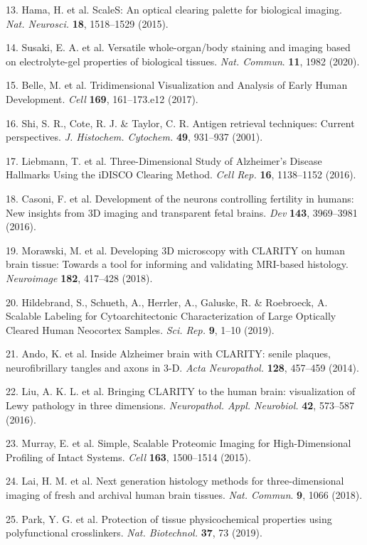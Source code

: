 \documentclass{article}
\begin{document}
\begin{hangpars}
13. Hama, H. et al. ScaleS: An optical clearing palette for biological imaging. \emph{Nat. Neurosci.} \textbf{18}, 1518–1529 (2015).

14. Susaki, E. A. et al. Versatile whole-organ/body staining and imaging based on electrolyte-gel properties of biological tissues. \emph{Nat. Commun}. \textbf{11}, 1982 (2020).

15. Belle, M. et al. Tridimensional Visualization and Analysis of Early Human Development. \emph{Cell} \textbf{169}, 161–173.e12 (2017).

16. Shi, S. R., Cote, R. J. \& Taylor, C. R. Antigen retrieval techniques: Current perspectives. \emph{J. Histochem. Cytochem.} \textbf{49}, 931–937 (2001).

17. Liebmann, T. et al. Three-Dimensional Study of Alzheimer’s Disease Hallmarks Using the iDISCO Clearing Method. \emph{Cell Rep.} \textbf{16}, 1138–1152 (2016).

18. Casoni, F. et al. Development of the neurons controlling fertility in humans: New insights from 3D imaging and transparent fetal brains. \emph{Dev} \textbf{143}, 3969–3981 (2016).

19. Morawski, M. et al. Developing 3D microscopy with CLARITY on human brain tissue: Towards a tool for informing and validating MRI-based histology. \emph{Neuroimage} \textbf{182}, 417–428 (2018).

20. Hildebrand, S., Schueth, A., Herrler, A., Galuske, R. \& Roebroeck, A. Scalable Labeling for Cytoarchitectonic Characterization of Large Optically Cleared Human Neocortex Samples. \emph{Sci. Rep.} \textbf{9}, 1–10 (2019).

21. Ando, K. et al. Inside Alzheimer brain with CLARITY: senile plaques, neurofibrillary tangles and axons in 3-D. \emph{Acta Neuropathol.} \textbf{128}, 457–459 (2014).

22. Liu, A. K. L. et al. Bringing CLARITY to the human brain: visualization of Lewy pathology in three dimensions. \emph{Neuropathol. Appl. Neurobiol.} \textbf{42}, 573–587 (2016).

23. Murray, E. et al. Simple, Scalable Proteomic Imaging for High-Dimensional Profiling of Intact Systems. \emph{Cell} \textbf{163}, 1500–1514 (2015).

24. Lai, H. M. et al. Next generation histology methods for three-dimensional imaging of fresh and archival human brain tissues. \emph{Nat. Commun}. \textbf{9}, 1066 (2018).

25. Park, Y. G. et al. Protection of tissue physicochemical properties using polyfunctional crosslinkers. \emph{Nat. Biotechnol.} \textbf{37}, 73 (2019).


\end{hangpars}
\end{document}

